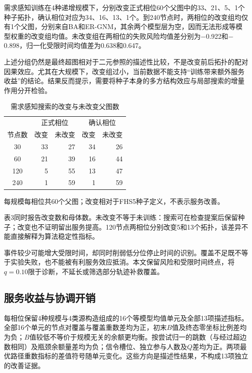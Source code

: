 \documentclass[UTF8,a4paper,twocolumn,fontset=none,zihao=5]{ctexart}
\begin{document}
需求感知训练在4种递增规模下，分别改变正式相位60个父图中的33、21、5、1个种子拓扑，确认相位对应为34、16、13、1个。到240节点时，两相位的改变组均仅有1个父图，分别来自BA和ER-GNM，其余两个模型层为空，因而无法形成等模型权重的改变组均值。未改变组在两相位的失败风险均值差分别为$-$0.922和$-$0.898，归一化受限时间均值差为0.638和0.647。


上述分组仍然是最终超图相对于二元参照的描述性比较，不是改变前后拓扑的配对因果效应。尤其在大规模下，改变组过小，当前数据不能支持“训练带来额外服务收益”的结论。结果反而提示，需要将种子本身的多方结构效应与局部搜索的增量作用分开检验。


\begin{table}[t]\centering
\caption{需求感知搜索的改变与未改变父图数}\label{tab:3}
\small\begin{tabular*}{\columnwidth}{@{\extracolsep{\fill}}crrrr}\toprule
&\multicolumn{2}{c}{正式相位}&\multicolumn{2}{c}{确认相位}\\
节点数&改变&未改变&改变&未改变\\\midrule
30 & 33 & 27 & 34 & 26\\
60 & 21 & 39 & 16 & 44\\
120 & 5 & 55 & 13 & 47\\
240 & 1 & 59 & 1 & 59\\
\bottomrule\end{tabular*}
\par\smallskip\footnotesize 每规模每相位共60个父图；改变相对于FHS5种子定义，不表示服务改善。
\end{table}

表3同时报告改变数和母体数。未改变不等于未训练：搜索可在检查提案后保留种子；改变也不证明留出服务提高。120节点两相位分别改变5和13个拓扑，该差异不能直接解释为算法稳定性指标。


事件较少可能增大受限时间，却同时削弱低分位停止时间的识别。覆盖不足既不等于实验失败，也不能被有利服务效应抵消。本文保留风险和受限时间终点，将$q=0.10$限于诊断，不延长或筛选部分轨迹补救覆盖。


\subsection{服务收益与协调开销}

每相位保留4种规模与4类源构造组成的16个等模型均值单元及全部13项描述指标。全部16个单元的节点对覆盖与覆盖重数差均为正，初末$B$值及终态零坐标比例差均为负；$B$值较低不等价于规模无关的余额更均衡。按尝试归一的跳数（与经过超边数相同）及瓶颈余额量差均为负；信令槽位、独立参与人数及$Q$差均为正。两项最优路径重数指标的差值符号随单元变化。这些方向是描述性结果，不构成13项独立的改善证据。
\end{document}
